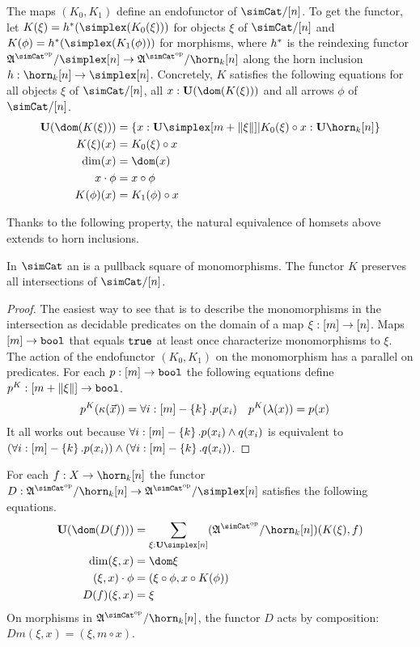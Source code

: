\documentclass[csh.tex]{subfiles}
\begin{document}
\begin{definition}
The maps $(K_0,K_1)$ define an endofunctor of $\simCat/[n]$. To get the functor, let $K(\xi) = h\ri(\simplex(K_0(\xi)))$ for objects $\xi$ of $\simCat/[n]$ and $K(\phi) = h\ri(\simplex(K_1(\phi)))$ for morphisms, where $h^*$ is the reindexing functor $\ambient\s/\simplex[n]\to\ambient\s/\horn_k[n]$ along the horn inclusion $h\of \horn_k[n]\to\simplex[n]$. Concretely, $K$ satisfies the following equations for all objects $\xi$ of $\simCat/[n]$, all $x\of \base(\dom(K(\xi)))$ and all arrows $\phi$ of $\simCat/[n]$.
\begin{align*}
\base(\dom(K(\xi))) &= \set{ x\of\base\simplex[m+\norm\xi]| K_0(\xi)\circ x\of\base\horn_k[n]}\\
K(\xi)(x) &= K_0(\xi)\circ x \\
\dim(x) &= \dom(x) \\
x\cdot\phi &= x\circ\phi \\
K(\phi)(x) &= K_1(\phi)\circ x
\end{align*}
\end{definition}

Thanks to the following property, the natural equivalence of homsets above extends to horn inclusions.

\begin{lemma} In $\simCat$ an  is a pullback square of monomorphisms. The functor $K$ preserves all intersections of $\simCat/[n]$. \end{lemma}

\begin{proof} The easiest way to see that is to describe the monomorphisms in the intersection as decidable predicates on the domain of a map $\xi:[m]\to[n]$. Maps $[m]\to\mathtt{bool}$ that equals $\mathtt{true}$ at least once characterize monomorphisms to $\xi$. The action of the endofunctor $(K_0,K_1)$ on the monomorphism has a parallel on predicates. For each $p:[m]\to\mathtt{bool}$ the following equations define $p^K: [m+\Vert \xi \Vert]\to\mathtt{bool}$. 
\begin{align*}
p^K(\kappa(\vec x)) &= \forall i:[m]-\left\{k\right\}.p(x_i) &
p^K(\lambda(x)) &= p(x)
\end{align*}
It all works out because $\forall i:[m]-\left\{k\right\}.p(x_i)\land q(x_i)$ is equivalent to $(\forall i:[m]-\left\{k\right\}.p(x_i))\land(\forall i:[m]-\left\{k\right\}.q(x_i))$.
\end{proof}

\begin{definition}
For each $f\of X\to\horn_k[n]$ the functor $D\of \ambient\s/\horn_k[n]\to\ambient\s/\simplex[n]$ satisfies the following equations.
\begin{align*}
\base(\dom(D(f))) &= \sum_{\xi\of\base\simplex[n]}(\ambient\s/\horn_k[n])(K(\xi),f)\\
\dim(\xi,x) &= \dom\xi\\
(\xi,x)\cdot\phi &= (\xi\circ\phi,x\circ K(\phi))\\
D(f)(\xi,x) &= \xi
\end{align*}
On morphisms in $\ambient\s/\horn_k[n]$, the functor $D$ acts by composition: $Dm(\xi,x) = (\xi,m\circ x)$. \label{descent functor}
\end{definition}
\end{document}

